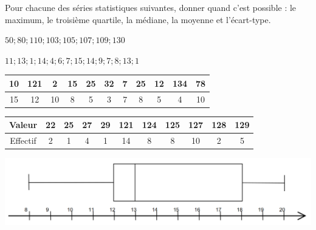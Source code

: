 Pour chacune des séries statistiques suivantes, donner quand c'est possible : le maximum, le troisième quartile, la médiane, la moyenne et l'écart-type.

\begin{questions}
	
	\question[2] $50; 80 ; 110 ; 103 ; 105 ; 107 ; 109 ; 130$
		
	\fillwithdottedlines{5cm}
	
	\question[2] $11; 13 ; 1 ;  14 ; 4 ; 6 ; 7 ; 15 ; 14; 9 ; 7 ; 8 ; 13 ; 1$
	
	\fillwithdottedlines{5cm}
		
%	
	
	
	
	\question[2] 
	\begin{tabular}{|@{\ \ }c@{\ \ }|@{\ \ }c@{\ \ }|@{\ \ }c@{\ \ }|@{\ \ }c@{\ \ }|@{\ \ }c@{\ \ }|@{\ \ }c@{\ \ }|@{\ \ }c@{\ \ }|@{\ \ }c@{\ \ }|@{\ \ }c@{\ \ }|@{\ \ }c@{\ \ }|@{\ \ }c@{\ \ }|}
		\hline
		10 & 121 & 2 & 15 & 25 & 32 & 7 & 25 & 12 & 134 & 78 \\ \hline
		15 & 12   & 10 & 8  & 5  & 3  & 7 & 8  & 5 & 4  & 10 \\ \hline
	\end{tabular}
	
	\fillwithdottedlines{5cm}
	
	\newpage
	
	\question[2] 
	
	\begin{tabular}{|@{\ \ }c@{\ \ }|@{\ \ }c@{\ \ }|@{\ \ }c@{\ \ }|@{\ \ }c@{\ \ }|@{\ \ }c@{\ \ }|@{\ \ }c@{\ \ }|@{\ \ }c@{\ \ }|@{\ \ }c@{\ \ }|@{\ \ }c@{\ \ }|@{\ \ }c@{\ \ }|@{\ \ }c@{\ \ }|}
		\hline
		Valeur   & 22 & 25 & 27 & 29 & 121 & 124 & 125 & 127 & 128 & 129 \\ \hline
		Effectif & 2 & 1 & 4 & 1 & 14  & 8 & 8 & 10  & 2  & 5  \\ \hline
	\end{tabular}
	
	\fillwithdottedlines{5cm}
	
	\question[2] 
	
	\begin{center}
		\includegraphics[scale=0.3]{boite2}
	\end{center} 
	
	\fillwithdottedlines{5cm}
	
\end{questions}